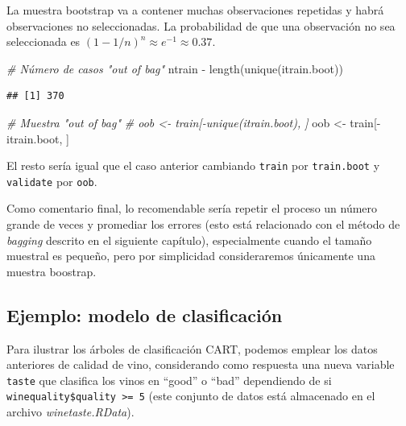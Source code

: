 \documentclass[
  spanish,
]{book}
\newenvironment{Shaded}{\begin{snugshade}}{\end{snugshade}}
\newcommand{\CommentTok}[1]{\textcolor[rgb]{0.56,0.35,0.01}{\textit{#1}}}
\newcommand{\FunctionTok}[1]{\textcolor[rgb]{0.00,0.00,0.00}{#1}}
\newcommand{\NormalTok}[1]{#1}
\newcommand{\OtherTok}[1]{\textcolor[rgb]{0.56,0.35,0.01}{#1}}
\newcommand{\SpecialCharTok}[1]{\textcolor[rgb]{0.00,0.00,0.00}{#1}}
\theoremstyle{break}
\theoremstyle{definition}
\theoremstyle{definition}
\theoremstyle{definition}
\theoremstyle{definition}
\theoremstyle{remark}
\begin{document}
La muestra bootstrap va a contener muchas observaciones repetidas y habrá observaciones no seleccionadas.
La probabilidad de que una observación no sea seleccionada es \((1 - 1/n)^n \approx e^{-1} \approx 0.37\).

\begin{Shaded}
\begin{Highlighting}[]
\CommentTok{\# Número de casos "out of bag"}
\NormalTok{ntrain }\SpecialCharTok{{-}} \FunctionTok{length}\NormalTok{(}\FunctionTok{unique}\NormalTok{(itrain.boot))}
\end{Highlighting}
\end{Shaded}

\begin{verbatim}
## [1] 370
\end{verbatim}

\begin{Shaded}
\begin{Highlighting}[]
\CommentTok{\# Muestra "out of bag"}
\CommentTok{\# oob \textless{}{-} train[{-}unique(itrain.boot), ]}
\NormalTok{oob }\OtherTok{\textless{}{-}}\NormalTok{ train[}\SpecialCharTok{{-}}\NormalTok{itrain.boot, ]}
\end{Highlighting}
\end{Shaded}

El resto sería igual que el caso anterior cambiando \texttt{train} por \texttt{train.boot} y \texttt{validate} por \texttt{oob}.

Como comentario final, lo recomendable sería repetir el proceso un número grande de veces y promediar los errores (esto está relacionado con el método de \emph{bagging} descrito en el siguiente capítulo), especialmente cuando el tamaño muestral es pequeño, pero por simplicidad consideraremos únicamente una muestra boostrap.

\hypertarget{class-rpart}{%
\subsection{Ejemplo: modelo de clasificación}\label{class-rpart}}

Para ilustrar los árboles de clasificación CART, podemos emplear los datos anteriores de calidad de vino, considerando como respuesta una nueva variable \texttt{taste} que clasifica los vinos en ``good'' o ``bad'' dependiendo de si \texttt{winequality\$quality\ \textgreater{}=\ 5} (este conjunto de datos está almacenado en el archivo \emph{winetaste.RData}).
\end{document}
